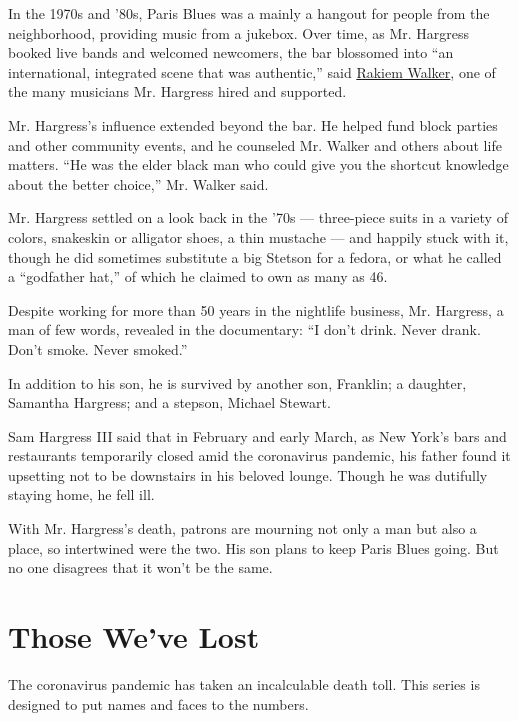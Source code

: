 In the 1970s and '80s, Paris Blues was a mainly a hangout for people
from the neighborhood, providing music from a jukebox. Over time, as Mr.
Hargress booked live bands and welcomed newcomers, the bar blossomed
into ``an international, integrated scene that was authentic,'' said
\href{https://rakiemwalker.com/}{Rakiem Walker}, one of the many
musicians Mr. Hargress hired and supported.

Mr. Hargress's influence extended beyond the bar. He helped fund block
parties and other community events, and he counseled Mr. Walker and
others about life matters. ``He was the elder black man who could give
you the shortcut knowledge about the better choice,'' Mr. Walker said.

Mr. Hargress settled on a look back in the '70s --- three-piece suits in
a variety of colors, snakeskin or alligator shoes, a thin mustache ---
and happily stuck with it, though he did sometimes substitute a big
Stetson for a fedora, or what he called a ``godfather hat,'' of which he
claimed to own as many as 46.

Despite working for more than 50 years in the nightlife business, Mr.
Hargress, a man of few words, revealed in the documentary: ``I don't
drink. Never drank. Don't smoke. Never smoked.''

In addition to his son, he is survived by another son, Franklin; a
daughter, Samantha Hargress; and a stepson, Michael Stewart.

Sam Hargress III said that in February and early March, as New York's
bars and restaurants temporarily closed amid the coronavirus pandemic,
his father found it upsetting not to be downstairs in his beloved
lounge. Though he was dutifully staying home, he fell ill.

With Mr. Hargress's death, patrons are mourning not only a man but also
a place, so intertwined were the two. His son plans to keep Paris Blues
going. But no one disagrees that it won't be the same.

\href{https://www.nytimes3xbfgragh.onion/interactive/2020/obituaries/people-died-coronavirus-obituaries.html?action=click\&pgtype=Article\&state=default\&region=BELOW_MAIN_CONTENT\&context=covid_obits_promo}{}

\hypertarget{those-weve-lost}{%
\section{Those We've Lost}\label{those-weve-lost}}

The coronavirus pandemic has taken an incalculable death toll. This
series is designed to put names and faces to the numbers.

